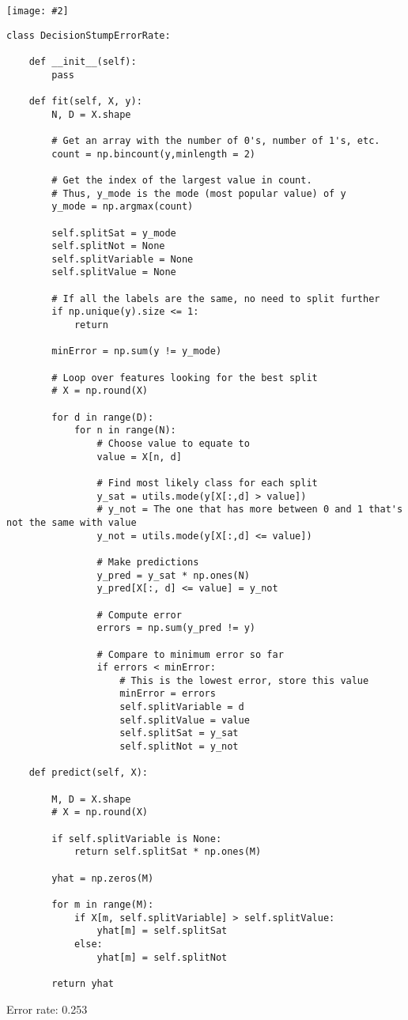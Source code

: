 \documentclass{article}
\def\red#1{{\color{red}#1}}
\newcommand{\centerfig}[2]{\begin{center}\texttt{[image: \#2]}\end{center}}
\begin{document}
\centerfig{0.7}{./figs/q6_2_decisionBoundary}
\begin{lstlisting}
class DecisionStumpErrorRate:

    def __init__(self):
        pass

    def fit(self, X, y):
        N, D = X.shape

        # Get an array with the number of 0's, number of 1's, etc.
        count = np.bincount(y,minlength = 2)    
        
        # Get the index of the largest value in count.  
        # Thus, y_mode is the mode (most popular value) of y
        y_mode = np.argmax(count) 

        self.splitSat = y_mode
        self.splitNot = None
        self.splitVariable = None
        self.splitValue = None

        # If all the labels are the same, no need to split further
        if np.unique(y).size <= 1:
            return

        minError = np.sum(y != y_mode)

        # Loop over features looking for the best split
        # X = np.round(X)

        for d in range(D):
            for n in range(N):
                # Choose value to equate to
                value = X[n, d]

                # Find most likely class for each split
                y_sat = utils.mode(y[X[:,d] > value])
                # y_not = The one that has more between 0 and 1 that's not the same with value
                y_not = utils.mode(y[X[:,d] <= value])

                # Make predictions
                y_pred = y_sat * np.ones(N)
                y_pred[X[:, d] <= value] = y_not

                # Compute error
                errors = np.sum(y_pred != y)

                # Compare to minimum error so far
                if errors < minError:
                    # This is the lowest error, store this value
                    minError = errors
                    self.splitVariable = d
                    self.splitValue = value
                    self.splitSat = y_sat
                    self.splitNot = y_not

    def predict(self, X):

        M, D = X.shape
        # X = np.round(X)

        if self.splitVariable is None:
            return self.splitSat * np.ones(M)

        yhat = np.zeros(M)

        for m in range(M):
            if X[m, self.splitVariable] > self.splitValue:
                yhat[m] = self.splitSat
            else:
                yhat[m] = self.splitNot

        return yhat

\end{lstlisting}
\red{Error rate: 0.253}
\end{document}
